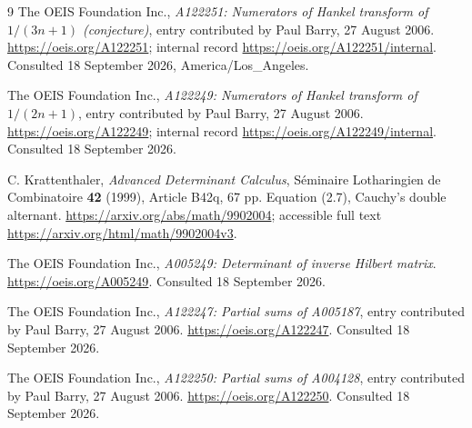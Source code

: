 \documentclass[11pt,a4paper]{article}
\theoremstyle{definition}
\theoremstyle{remark}
\begin{document}
\begin{thebibliography}{9}
The OEIS Foundation Inc., \emph{A122251: Numerators of Hankel transform of
$1/(3n+1)$ (conjecture)}, entry contributed by Paul Barry, 27 August 2006.
\url{https://oeis.org/A122251}; internal record
\url{https://oeis.org/A122251/internal}. Consulted 18 September 2026,
America/Los\_Angeles.

The OEIS Foundation Inc., \emph{A122249: Numerators of Hankel transform of
$1/(2n+1)$}, entry contributed by Paul Barry, 27 August 2006.
\url{https://oeis.org/A122249}; internal record
\url{https://oeis.org/A122249/internal}. Consulted 18 September 2026.

C. Krattenthaler, \emph{Advanced Determinant Calculus}, S\'eminaire
Lotharingien de Combinatoire \textbf{42} (1999), Article B42q, 67 pp.
Equation (2.7), Cauchy's double alternant.
\url{https://arxiv.org/abs/math/9902004}; accessible full text
\url{https://arxiv.org/html/math/9902004v3}.

The OEIS Foundation Inc., \emph{A005249: Determinant of inverse Hilbert
matrix}. \url{https://oeis.org/A005249}. Consulted 18 September 2026.

The OEIS Foundation Inc., \emph{A122247: Partial sums of A005187}, entry
contributed by Paul Barry, 27 August 2006.
\url{https://oeis.org/A122247}. Consulted 18 September 2026.

The OEIS Foundation Inc., \emph{A122250: Partial sums of A004128}, entry
contributed by Paul Barry, 27 August 2006.
\url{https://oeis.org/A122250}. Consulted 18 September 2026.
\end{thebibliography}
\end{document}

